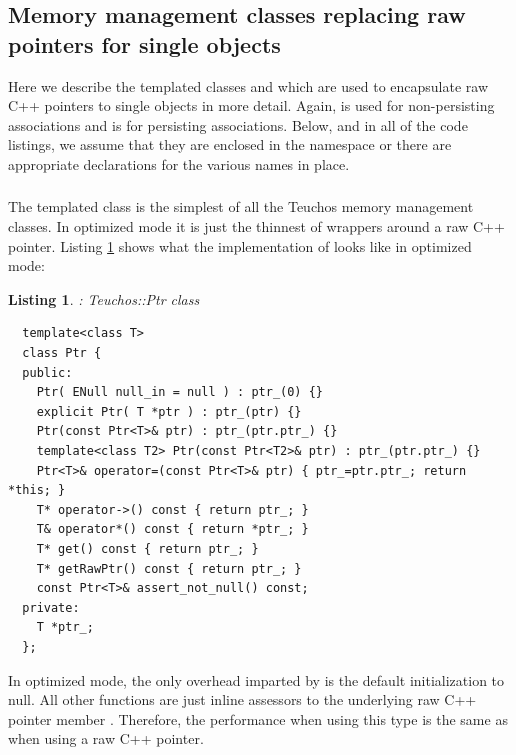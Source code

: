 \documentclass[pdf,ps2pdf,11pt]{SANDreport}
\newtheorem{listing}{Listing}
\begin{document}
%
{}\subsection{Memory management classes replacing raw pointers for
single objects}
%

Here we describe the templated classes {} and
{} which are used to encapsulate raw C++ pointers to
single objects in more detail.  Again, {} is used for
non-persisting associations and {} is for persisting
associations.  Below, and in all of the code listings, we assume that
they are enclosed in the {} namespace or there are
appropriate {} declarations for the various
names in place.

%
{}\subsubsection{}
\label{sec:Ptr}
%

The templated class {} is the simplest of all the Teuchos
memory management classes.  In optimized mode it is just the thinnest
of wrappers around a raw C++ pointer.  Listing {}\ref{listing:Ptr}
shows what the implementation of {} looks like in
optimized mode:

\begin{listing}: Teuchos::Ptr class\\
\label{listing:Ptr}
{\small\begin{verbatim}
  template<class T>
  class Ptr {
  public:
    Ptr( ENull null_in = null ) : ptr_(0) {}
    explicit Ptr( T *ptr ) : ptr_(ptr) {}
    Ptr(const Ptr<T>& ptr) : ptr_(ptr.ptr_) {}
    template<class T2> Ptr(const Ptr<T2>& ptr) : ptr_(ptr.ptr_) {}
    Ptr<T>& operator=(const Ptr<T>& ptr) { ptr_=ptr.ptr_; return *this; }
    T* operator->() const { return ptr_; }
    T& operator*() const { return *ptr_; }
    T* get() const { return ptr_; }
    T* getRawPtr() const { return ptr_; }
    const Ptr<T>& assert_not_null() const;
  private:
    T *ptr_;
  };
\end{verbatim}}
\end{listing}

In optimized mode, the only overhead imparted by {} is the
default initialization to null.  All other functions are just inline
assessors to the underlying raw C++ pointer member {}.
Therefore, the performance when using this type is the same as when
using a raw C++ pointer.
\end{document}
